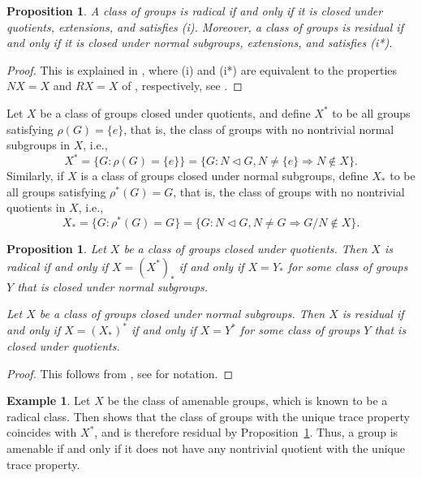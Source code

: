 \documentclass[a4paper]{amsart}
\theoremstyle{plain}
\newtheorem{proposition}[theorem]{Proposition}
\theoremstyle{definition}
\newtheorem{example}[theorem]{Example}
\theoremstyle{remark}
\numberwithin{theorem}{section}
\begin{document}
\begin{proposition}
A class of groups is radical if and only if it is closed under quotients, extensions, and satisfies \textup{(i)}.
Moreover, a class of groups is residual if and only if it is closed under normal subgroups, extensions, and satisfies \textup{(i*)}.
\end{proposition}

\begin{proof}
This is explained in \cite[Theorems~1.32 and~1.35]{Robinson},
where (i) and (i*) are equivalent to the properties $NX=X$ and $RX=X$ of \cite[p.~20 and p.~23]{Robinson}, respectively,
see \cite[p.~19]{Robinson}.
\end{proof}

Let $X$ be a class of groups closed under quotients, and define $X^*$ to be all groups satisfying $\rho(G)=\{e\}$,
that is, the class of groups with no nontrivial normal subgroups in $X$, i.e.,
\[
X^*=\{G : \rho(G)=\{e\}\}=\{G : N\triangleleft G, N\neq \{e\}\Rightarrow N\notin X\}.
\]
Similarly, if $X$ is a class of groups closed under normal subgroups, define $X_*$ to be all groups satisfying $\rho^*(G)=G$,
that is, the class of groups with no nontrivial quotients in $X$, i.e.,
\[
X_*=\{G : \rho^*(G)=G\}=\{G : N\triangleleft G, N\neq G\Rightarrow G/N\notin X\}.
\]

\begin{proposition}\label{prop:radical duality}
Let $X$ be a class of groups closed under quotients.
Then $X$ is radical if and only if $X=(X^*)_*$ if and only if $X=Y_*$ for some class of groups $Y$ that is closed under normal subgroups.

Let $X$ be a class of groups closed under normal subgroups.
Then $X$ is residual if and only if $X=(X_*)^*$ if and only if $X=Y^*$ for some class of groups $Y$ that is closed under quotients.
\end{proposition}

\begin{proof}
This follows from \cite[Theorems~1.38 and~1.39]{Robinson}, see \cite[p.~6-7]{Robinson} for notation.
\end{proof}

\begin{example}\label{ex:AR}
Let $X$ be the class of amenable groups, which is known to be a radical class.
Then \cite[Theorem~1.3]{BKKO} shows that the class of groups with the unique trace property coincides with $X^*$,
and is therefore residual by Proposition~\ref{prop:radical duality}.
Thus, a group is amenable if and only if it does not have any nontrivial quotient with the unique trace property.
\end{example}
\end{document}
